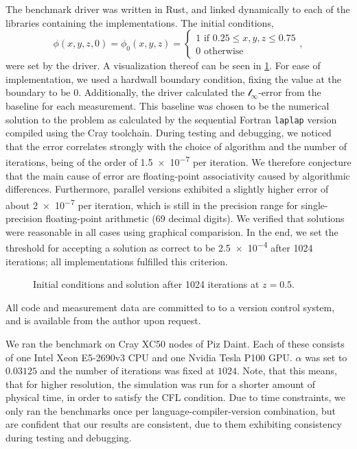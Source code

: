 \documentclass[british]{scrreprt}
\begin{document}
The benchmark driver was written in Rust, and linked dynamically to each of the libraries containing the implementations. The initial conditions,
\begin{equation}
	\phi(x, y, z, 0) = \phi_{0}(x, y, z) = \begin{cases}
		1 \text{ if } 0.25 \leq x, y, z \leq 0.75 \\
		0 \text{ otherwise}
	\end{cases},
	\label{eq:initial-conditons}
\end{equation}
were set by the driver. A visualization thereof can be seen in \cref{fig:initial-conditions}. For ease of implementation, we used a hardwall boundary condition, fixing the value at the boundary to be \( 0 \). Additionally, the driver calculated the \( \mathcal{l}_{\infty} \)-error from the baseline for each measurement. This baseline was chosen to be the numerical solution to the problem as calculated by the sequential Fortran \texttt{laplap} version compiled using the Cray toolchain. During testing and debugging, we noticed that the error correlates strongly with the choice of algorithm and the number of iterations, being of the order of \num{1.5e-7} per iteration. We therefore conjecture that the main cause of error are floating-point associativity caused by algorithmic differences. Furthermore, parallel versions exhibited a slightly higher error of about \num{2e-7} per iteration, which is still in the precision range for single-precision floating-point arithmetic (6\textendash{}9 decimal digits). We verified that solutions were reasonable in all cases using graphical comparision. In the end, we set the threshold for accepting a solution as correct to be \num{2.5e-4} after 1024 iterations; all implementations fulfilled this criterion.

\begin{figure}
	\centering
	{\sffamily
		
	}
	\caption{Initial conditions and solution after 1024 iterations at \( z = 0.5 \).}
	\label{fig:initial-conditions}
\end{figure}

All code and measurement data are committed to to a version control system, and is available from the author upon request.

We ran the benchmark on Cray XC50 nodes of Piz Daint. Each of these consists of one Intel Xeon E5-2690v3 CPU and one Nvidia Tesla P100 GPU. \( \alpha \) was set to \( 0.03125 \) and the number of iterations was fixed at \( 1024 \). Note, that this means, that for higher resolution, the simulation was run for a shorter amount of physical time, in order to satisfy the CFL condition. Due to time constraints, we only ran the benchmarks once per language-compiler-version combination, but are confident that our results are consistent, due to them exhibiting consistency during testing and debugging.
\end{document}
